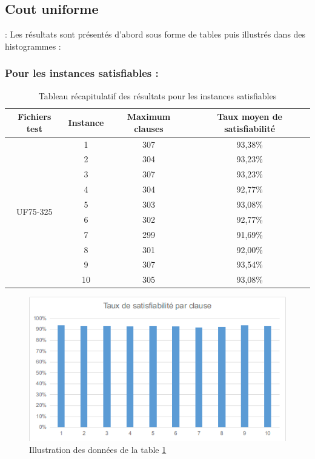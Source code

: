 \subsection{Cout uniforme} :
Les résultats sont présentés d'abord sous forme de tables puis illustrés dans des histogrammes : 
\subsubsection{Pour les instances satisfiables :}
\begin{table}[H]
	\centering
	\begin{tabular}{|c|c|c|c|}
		\hline
		Fichiers test               & Instance & Maximum clauses & Taux moyen de satisfiabilité \\ \hline
		\multirow{10}{*}{UF75-325} & 1        & 307             & 93,38\%                      \\ \cline{2-4} 
		& 2        & 304             & 93,23\%                      \\ \cline{2-4} 
		& 3        & 307             & 93,23\%                      \\ \cline{2-4} 
		& 4        & 304             & 92,77\%                      \\ \cline{2-4} 
		& 5        & 303             & 93,08\%                      \\ \cline{2-4} 
		& 6        & 302             & 92,77\%                      \\ \cline{2-4} 
		& 7        & 299             & 91,69\%                      \\ \cline{2-4} 
		& 8        & 301             & 92,00\%                      \\ \cline{2-4} 
		& 9        & 307             & 93,54\%                      \\ \cline{2-4} 
		& 10       & 305             & 93,08\%                      \\ \hline
	\end{tabular}
	\caption{Tableau récapitulatif des résultats pour les instances satisfiables}
	\label{table:Tab_UniformCost_Sat}
\end{table}
\begin{figure}[H]
	\includegraphics[width=\textwidth]{images/UniformCostUF75Graph.png}
	\caption{Illustration des données de la table \ref{table:Tab_UniformCost_Sat}}
\end{figure}


